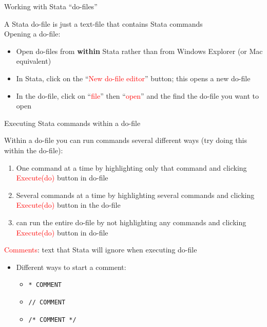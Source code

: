 \begin{frame}{Working with Stata ``do-files''}
	
	A Stata do-file is just a text-file that contains Stata commands \\
	\vspace{3mm}
	Opening a do-file:
	\begin{itemize}
		\item Open do-files from \textbf{within} Stata rather than from Windows Explorer (or Mac equivalent)
		\item In Stata, click on the ``\textcolor{red}{New do-file editor}'' button; this opens a new do-file
		\item In the do-file, click on ``\textcolor{red}{file}'' then ``\textcolor{red}{open}'' and the find the do-file you want to open
	\end{itemize}
	
\end{frame}

\begin{frame}[shrink=3]{Executing Stata commands within a do-file}
	
	Within a do-file you can run commands several different ways (try doing this within the do-file):
	\begin{enumerate}
		\item One command at a time by highlighting only that command and clicking \textcolor{red}{Execute(do)} button in do-file
		\item Several commands at a time by highlighting several commands and clicking \textcolor{red}{Execute(do)} button in the do-file
		\item can run the entire do-file by not highlighting any commands and clicking \textcolor{red}{Execute(do)} button in do-file
	\end{enumerate}	
	
	\vspace{3mm}
	
	\textcolor{red}{Comments}: text that Stata will ignore when executing do-file
	\begin{itemize}	
		\item Different ways to start a comment:
		\begin{itemize}
			\item \texttt{* COMMENT}
			\item \texttt{// COMMENT}
			\item \texttt{/* COMMENT */}
		\end{itemize}
	\end{itemize}		
\end{frame}


